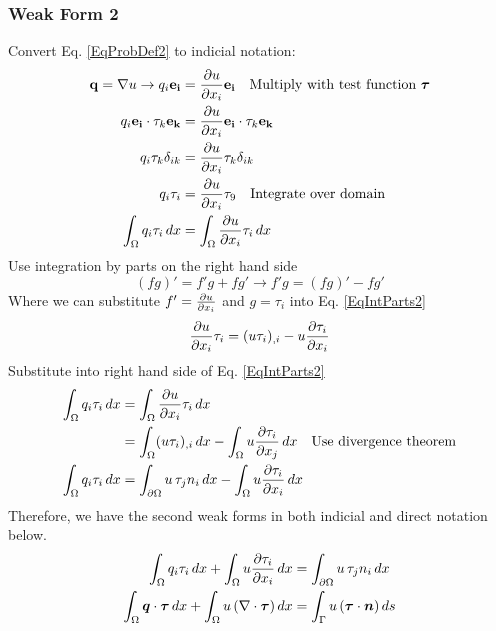 \documentclass[12pt,3p]{article}
\begin{document}
\subsubsection{Weak Form 2}
Convert Eq. \ref{EqProbDef2} to indicial notation: 
\begin{align}\label{EqParts}
\begin{split}
\mathbf{q} = \nabla u \rightarrow q_{i} \mathbf{e_i} &= \pdv{u}{x_i} \mathbf{e_i} \quad \text{Multiply with test function } \bm{\tau} \\
q_{i} \mathbf{e_i} \cdot \tau_k \mathbf{e_k} &= \pdv{u}{x_i} \mathbf{e_i} \cdot \tau_k \mathbf{e_k} \\
q_{i} \tau_k \delta_{ik} &= \pdv{u}{x_i} \tau_k \delta_{ik} \\
q_{i} \tau_i &= \pdv{u}{x_i} \tau_9 \quad \text{Integrate over domain} \\
\int_{\Omega} q_{i} \tau_i  \, dx &= \int_{\Omega} \pdv{u}{x_i} \tau_i \, dx
\end{split}
\end{align}
Use integration by parts on the right hand side 
\begin{equation}\label{EqIntParts2}
(fg)' = f'g + fg' \rightarrow f'g = (fg)' - fg'
\end{equation}
Where we can substitute $f' = \pdv{u}{x_i} $ and $g = \tau_i$ into Eq. \ref{EqIntParts2}
\begin{equation*}
\pdv{u}{x_i} \tau_i = (u \tau_i)_{,i} - u \pdv{\tau_i}{x_i}
\end{equation*}
Substitute into right hand side of Eq. \ref{EqIntParts2}
\begin{align*}
\int_{\Omega} q_{i} \tau_i  \, dx 
	&= \int_{\Omega} \pdv{u}{x_i} \tau_i \, dx \\
	&=  \int_{\Omega} (u  \tau_i)_{,i} \, dx 
	- \int_{\Omega} u \pdv{\tau_i}{x_j} \, dx \quad \text{Use divergence theorem} \\
\int_{\Omega} q_{i} \tau_i  \, dx 
	&= \int_{\partial \Omega} u \, \tau_j n_i \, dx - \int_{\Omega} u \pdv{\tau_i}{x_i} \, dx
\end{align*}
Therefore, we have the second weak forms in both indicial and direct notation below.
\begin{subequations}\label{EqWeakForm3}
\begin{align}
\int_{\Omega} q_{i} \tau_i  \, dx + \int_{\Omega} u \pdv{\tau_i}{x_i} \, dx 
	&= \int_{\partial \Omega} u \, \tau_j n_i \, dx \\
\int_{\Omega} \bm{q} \cdot \bm{\tau} \, dx + \int_{\Omega} u \, (\nabla \cdot \bm{\tau}) \, dx &= \int_{\Gamma} u \,(\bm{\tau} \cdot \bm{n})  \, ds 
\end{align}
\end{subequations}
\end{document}
